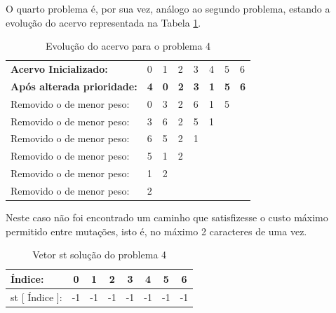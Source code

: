 \documentclass[a4paper, 11pt]{article}
\begin{document}
    \par O quarto problema é, por sua vez, análogo ao segundo problema, estando a evolução do acervo representada na Tabela \ref{acv4}.
    
    \begin{table}[h]
	\centering
	\begin{tabular}{llllllllllllll}
	\multicolumn{7}{l}{\textbf{Acervo Inicializado:}}      & 0          & 1          & 2          & 3          & 4          & 5          & 6          \\
	\multicolumn{7}{l}{\textbf{Após alterada prioridade:}} & \textbf{4} & \textbf{0} & \textbf{2} & \textbf{3} & \textbf{1} & \textbf{5} & \textbf{6} \\
	\multicolumn{7}{l}{Removido o de menor peso:}          & 0          & 3          & 2          & 6          & 1          & 5          &            \\
	\multicolumn{7}{l}{Removido o de menor peso:}          & 3          & 6          & 2          & 5          & 1          &            &            \\
	\multicolumn{7}{l}{Removido o de menor peso:}          & 6          & 5          & 2          & 1          &            &            &            \\
	\multicolumn{7}{l}{Removido o de menor peso:}          & 5          & 1          & 2          &            &            &            &            \\
	\multicolumn{7}{l}{Removido o de menor peso:}          & 1          & 2          &            &            &            &            &            \\
	\multicolumn{7}{l}{Removido o de menor peso:}          & 2          &            &            &            &            &            &           
	\end{tabular}
	\caption{Evolução do acervo para o problema 4}
	\label {acv4}
	\end{table}
		
	\par Neste caso não foi encontrado um caminho que satisfizesse o custo máximo permitido entre mutações, isto é, no máximo 2 caracteres de uma vez.
    
    \begin{table}[h]
	\begin{center}
	\begin{tabular}{|l|c|c|c|c|c|c|c|}
    \hline
	Índice: & 0  & 1 & 2  & 3  & 4  & 5 & 6 \\ \hline
	st {[} Índice {]}: & -1 & -1 & -1 & -1 & -1 & -1 & -1 \\
    \hline
	\end{tabular}
    \caption{Vetor st solução do problema 4}
    \label{vct}
    \end{center}
	\end{table} 
	
\end{document}
